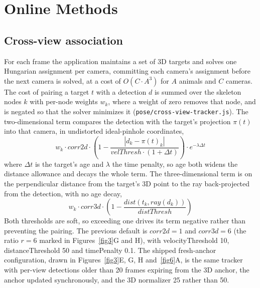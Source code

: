 \documentclass[11pt]{article}
\begin{document}
\section*{Online Methods}

\subsection*{Cross-view association}\label{methods-association-standalone}

For each frame the application maintains a set of 3D targets and solves one Hungarian assignment per camera, committing each camera's assignment before the next camera is solved, at a cost of $O(C \cdot A^3)$ for $A$ animals and $C$ cameras. The cost of pairing a target $t$ with a detection $d$ is summed over the skeleton nodes $k$ with per-node weights $w_k$, where a weight of zero removes that node, and is negated so that the solver minimizes it (\texttt{pose/cross-view-tracker.js}). The two-dimensional term compares the detection with the target's projection $\pi(t)$ into that camera, in undistorted ideal-pinhole coordinates,
\[
  w_k \cdot corr2d \cdot \left(1 - \frac{|d_k - \pi(t)_k|}{velThresh \cdot (1 + \Delta t)}\right) \cdot e^{-\lambda \Delta t}
\]
where $\Delta t$ is the target's age and $\lambda$ the time penalty, so age both widens the distance allowance and decays the whole term. The three-dimensional term is on the perpendicular distance from the target's 3D point to the ray back-projected from the detection, with no age decay,
\[
  w_k \cdot corr3d \cdot \left(1 - \frac{dist(t_k, ray(d_k))}{distThresh}\right)
\]
Both thresholds are soft, so exceeding one drives its term negative rather than preventing the pairing. The previous default is $corr2d = 1$ and $corr3d = 6$ (the ratio $r = 6$ marked in Figures~\ref{fig3}G and H), with velocityThreshold 10, distanceThreshold 50 and timePenalty 0.1. The shipped fresh-anchor configuration, drawn in Figures~\ref{fig3}E, G, H and~\ref{fig6}A, is the same tracker with per-view detections older than 20 frames expiring from the 3D anchor, the anchor updated synchronously, and the 3D normalizer 25 rather than 50.
\end{document}
